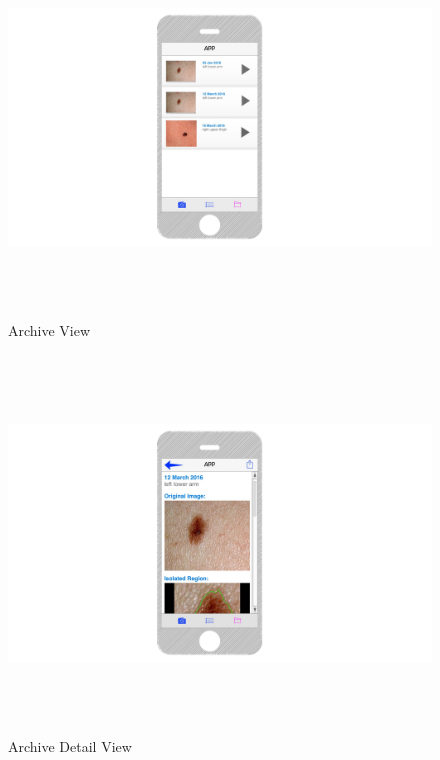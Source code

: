 \begin{figure}[H]
    \centering
    \includegraphics[height=10cm,keepaspectratio]{assets/GUI/archive_view.pdf}
    \caption{Archive View}
    \label{fig:archive_view}
\end{figure}

\begin{figure}[H]
    \centering
    \includegraphics[height=10cm,keepaspectratio]{assets/GUI/archive_detail_view.pdf}
    \caption{Archive Detail View}
    \label{fig:archive_detail}
\end{figure}